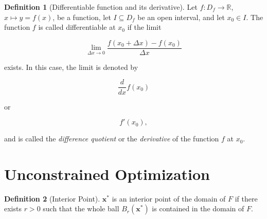 \documentclass{article}
\theoremstyle{definition}
\newtheorem{definition}{Definition}
\theoremstyle{Solution}
\begin{document}
\begin{definition}[Differentiable function and its derivative]
Let $f:D_f \rightarrow \mathbb{R}$, $x \mapsto y=f(x)$, be a function, let $I \subseteq D_f$ be an open interval, and let $x_0 \in I$. The function $f$ is called differentiable at $x_0$ if the limit

\begin{equation}
	\lim_{\Delta x \rightarrow 0}
	\frac{f(x_0+\Delta x)-f(x_0)}{\Delta x}
\end{equation}

exists. In this case, the limit is denoted by

\begin{equation}
	\frac{d}{dx}f(x_0)
\end{equation}

or

\begin{equation}
	f'(x_0),
\end{equation}

and is called the \textit{difference quotient} or the \textit{derivative} of the function $f$ at $x_0$.
\end{definition}

\section{Unconstrained Optimization}

\begin{definition}[Interior Point] $\mathbf{x}^*$ is an interior point of the domain of $F$ if there exists $r>0$ such that the whole ball $B_r(\mathbf{x}^*)$ is contained in the domain of $F$.
\end{definition}
\end{document}
